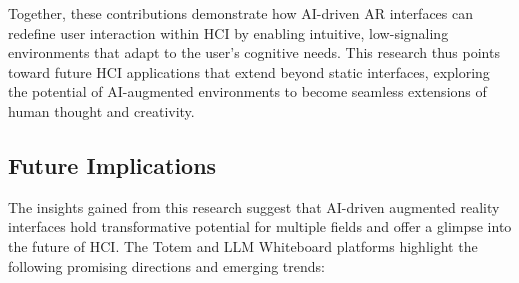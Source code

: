 Together, these contributions demonstrate how AI-driven AR interfaces can redefine user interaction within HCI by enabling intuitive, low-signaling environments that adapt to the user’s cognitive needs.%
This research thus points toward future HCI applications that extend beyond static interfaces, exploring the potential of AI-augmented environments to become seamless extensions of human thought and creativity.

\subsection{Future Implications}

The insights gained from this research suggest that AI-driven augmented reality interfaces hold transformative potential for multiple fields and offer a glimpse into the future of HCI.
The Totem and LLM Whiteboard platforms highlight the following promising directions and emerging trends:
